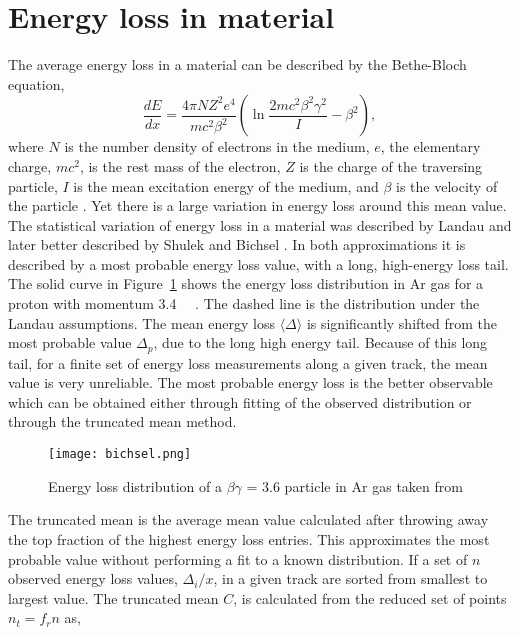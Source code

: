 \section{Energy loss in material}
\label{sec:energyloss}

The average energy loss in a material can be described by the Bethe-Bloch equation,
\begin{equation}\label{eq:bb}
\frac{dE}{dx} = \frac{4\pi NZ^2e^4}{mc^2\beta^2} (\ln \frac{2mc^2\beta^2\gamma^2}{I} - \beta^2),
\end{equation}
where $N$ is the number density of electrons in the medium, $e$, the elementary charge, $mc^2$, is the rest mass of the electron, $Z$ is the charge of the traversing particle, $I$ is the mean excitation energy of the medium, and $\beta$ is the velocity of the particle \cite{blumrol}. Yet there is a large variation in energy loss around this mean value. The statistical variation of energy loss in a material was described by Landau \cite{landau} and later better described by Shulek \cite{shulek} and Bichsel \cite{bichsel1}. In both approximations it is described by a most probable energy loss value, with a long, high-energy loss tail. The solid curve in Figure~\ref{fig:straggling} shows the energy loss distribution in Ar gas for a proton with momentum \SI{3.4}{\giga\eVperc} \cite{bichsel}. The dashed line is the distribution under the Landau assumptions. The mean energy loss $\langle\Delta\rangle$ is significantly shifted from the most probable value $\Delta_p$, due to the long high energy tail.  Because of this long tail, for a finite set of energy loss measurements along a given track, the mean value is very unreliable. The most probable energy loss is the better observable which can be obtained either through fitting of the observed distribution or through the truncated mean method. 

\begin{figure}
\texttt{[image: bichsel.png]}
\caption{Energy loss distribution of a $\beta\gamma$ = 3.6 particle in Ar gas taken from \cite{bichsel}}
\label{fig:straggling}
\end{figure}

The truncated mean is the average mean value calculated after throwing away the top fraction of the highest energy loss entries. This approximates the most probable value without performing a fit to a known distribution. If a set of $n$ observed energy loss values, $\Delta_i/x$, in a given track are sorted from smallest to largest value. The truncated mean $C$, is calculated from the reduced set of points $n_t = f_r n$ as,

